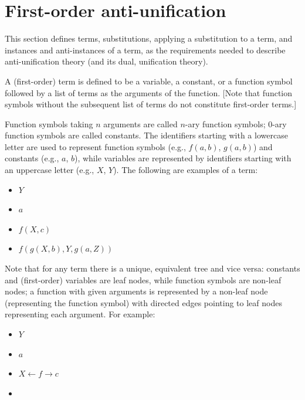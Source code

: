 \section{First-order anti-unification}   \label{AU}

This section defines terms, substitutions, applying a substitution to a term, and instances and anti-instances of a term, as the requirements needed  to describe anti-unification theory (and its dual, unification theory).

\begin{defn}[Term]\label{def:term}
A (first-order) term is defined to be a variable, a constant, or a function symbol followed by a list of terms as the arguments of the function.  [Note that function symbols without the subsequent list of terms do not constitute first-order terms.]
\end{defn}

Function symbols taking $n$ arguments are called $n$-ary function symbols; 0-ary function symbols are called constants. The identifiers starting with a lowercase letter are used to represent function symbols (e.g., $f(a,b)$, $g(a,b)$) and constants (e.g., $a$, $b$), while variables are represented by identifiers starting with an uppercase letter (e.g., $X$, $Y$). The following are examples of a term:
\begin{itemize} [leftmargin=0.7in]
\item $Y$
\item $a$
\item $f(X, c)$
\item $f(g(X, b),Y, g(a, Z))$
\end{itemize}
Note that for any term there is a unique, equivalent tree and vice versa: constants and (first-order) variables are leaf nodes, while function symbols are non-leaf nodes; a function with given arguments is represented by a non-leaf node (representing the function symbol) with directed edges pointing to leaf nodes representing each argument.  For example:
\begin{itemize} [leftmargin=0.7in]
\item $Y$
\item $a$
\item $X \leftarrow f \rightarrow c$
\item {}
\end{itemize}

